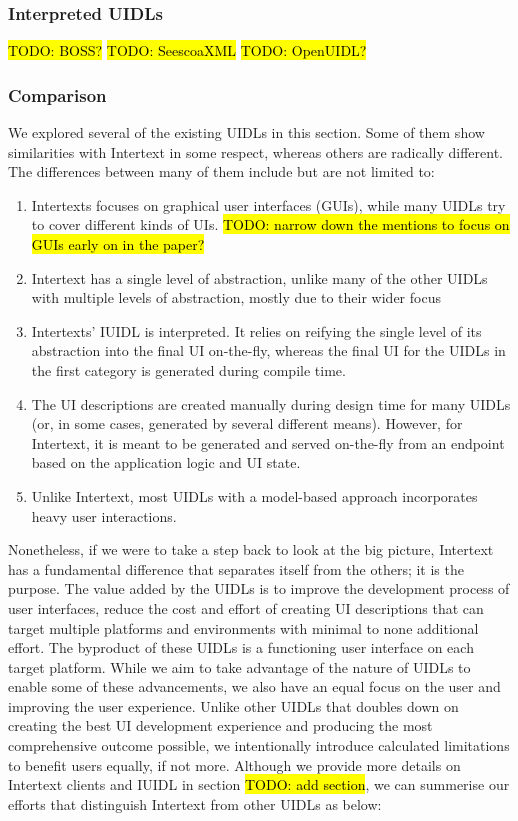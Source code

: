 \subsubsection{Interpreted UIDLs}

\hl{TODO: BOSS?}
\hl{TODO: SeescoaXML}
\hl{TODO: OpenUIDL?}

\subsubsection{Comparison}

We explored several of the existing UIDLs in this section. Some of them show similarities with Intertext in some respect, whereas others are radically different. The differences between many of them include but are not limited to:

\begin{enumerate}
  \item Intertexts focuses on graphical user interfaces (GUIs), while many UIDLs try to cover different kinds of UIs. \hl{TODO: narrow down the mentions to focus on GUIs early on in the paper?}
  \item Intertext has a single level of abstraction, unlike many of the other UIDLs with multiple levels of abstraction, mostly due to their wider focus
  \item Intertexts' IUIDL is interpreted. It relies on reifying the single level of its abstraction into the final UI on-the-fly, whereas the final UI for the UIDLs in the first category is generated during compile time.
  \item The UI descriptions are created manually during design time for many UIDLs (or, in some cases, generated by several different means). However, for Intertext, it is meant to be generated and served on-the-fly from an endpoint based on the application logic and UI state.
  \item Unlike Intertext, most UIDLs with a model-based approach incorporates heavy user interactions.
\end{enumerate}

Nonetheless, if we were to take a step back to look at the big picture, Intertext has a fundamental difference that separates itself from the others; it is the purpose. The value added by the UIDLs is to improve the development process of user interfaces, reduce the cost and effort of creating UI descriptions that can target multiple platforms and environments with minimal to none additional effort. The byproduct of these UIDLs is a functioning user interface on each target platform. While we aim to take advantage of the nature of UIDLs to enable some of these advancements, we also have an equal focus on the user and improving the user experience. Unlike other UIDLs that doubles down on creating the best UI development experience and producing the most comprehensive outcome possible, we intentionally introduce calculated limitations to benefit users equally, if not more. Although we provide more details on Intertext clients and IUIDL in section \hl{TODO: add section}, we can summerise our efforts that distinguish Intertext from other UIDLs as below:

